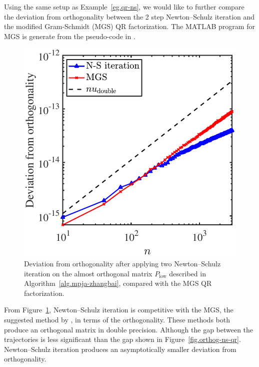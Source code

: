 \documentclass{article}
\numberwithin{equation}{section} %
\begin{document}
\begin{example}
Using the same setup as Example~\ref{eg.qr-ns}, we would like to further
compare the deviation from orthogonality between the 2 step Newton--Schulz
iteration and the modified Gram-Schmidt (MGS) QR factorization. The MATLAB
program for MGS is generate from the pseudo-code in .

\begin{figure}[H]
\centering
\includegraphics[width = 0.5 \textwidth]{./figs/ns-mgs.pdf}
\caption{Deviation from orthogonality after applying two Newton--Schulz
  iteration on the almost orthogonal matrix $P_{\mathrm{low}}$ described in
  Algorithm~\ref{alg.mpja-zhangbai}, compared with the MGS QR
  factorization.}  
\label{fig.orthog-ns-mgs}
\end{figure}

From Figure~\ref{fig.orthog-ns-mgs}, Newton--Schulz iteration is
competitive with the MGS, the suggested method by , in
terms of the orthogonality. These methods both produce an orthogonal matrix
in double precision. Although the gap between the trajectories is less
significant than the gap shown in Figure~\ref{fig.orthog-ns-qr}.
Newton--Schulz iteration produces an asymptotically smaller deviation from
orthogonality. 
\end{example}











\newpage

 
\end{document}
